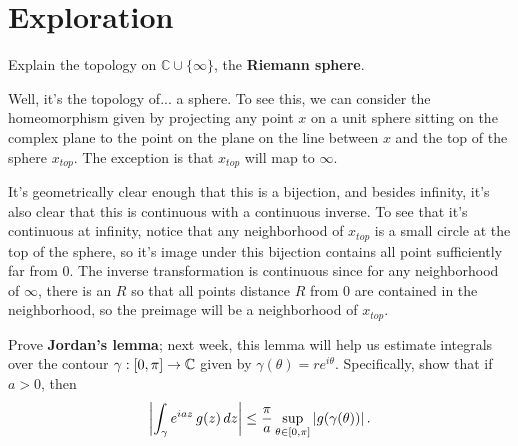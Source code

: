 \documentclass{homework}
\begin{document}
                          \section{Exploration}

                          \begin{problem}
                            Explain the topology on $\mathbb{C} \cup \{ \infty \}$, the \textbf{Riemann sphere}.
                            \end{problem}
                            \begin{solution}
                            Well, it's the topology of... a sphere. To see this, we can consider the homeomorphism given by projecting any point $x$ on a unit sphere sitting on the complex plane to the point on the plane on the line between $x$ and the top of the sphere $x_{top}$. The exception is that $x_{top} $ will map to $\infty$.

                            It's geometrically clear enough that this is a bijection, and besides infinity, it's also clear that this is continuous with a continuous inverse. To see that it's continuous at infinity, notice that any neighborhood of $x_{top}$ is a small circle at the top of the sphere, so it's image under this bijection contains all point sufficiently far from 0. The inverse transformation is continuous since for any neighborhood of $\infty$, there is an $R$ so that all points distance $R$ from 0 are contained in the neighborhood, so the preimage will be a neighborhood of $x_{top}$.

                            \end{solution}
                            \begin{problem}\label{jordans-lemma}
                              Prove \textbf{Jordan's lemma}; next week, this lemma will help us estimate integrals over the contour $\gamma : [0,\pi] \to \mathbb{C}$ given by $\gamma(\theta) = re^{i\theta}$.
                                Specifically, show that if $a > 0$, then
                                  \[
                                      \left|\int_\gamma e^{iaz} \, g(z) \, dz \right| \leq \frac{\pi}{a} \sup_{\theta \in [0,\pi]} \left|g(\gamma(\theta))\right|.
                                          \]
                                          \end{problem}
\end{document}
